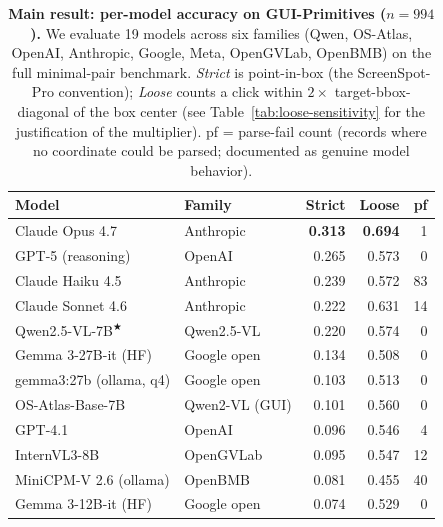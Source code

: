 \begin{table}[t]
\centering
\small
\begin{threeparttable}
\caption{\textbf{Main result: per-model accuracy on GUI-Primitives ($n{=}994$).}
We evaluate 19 models across six families (Qwen, OS-Atlas, OpenAI, Anthropic,
Google, Meta, OpenGVLab, OpenBMB) on the full minimal-pair benchmark.
\emph{Strict} is point-in-box (the ScreenSpot-Pro convention); \emph{Loose}
counts a click within $2{\times}$ target-bbox-diagonal of the box center
(see Table~\ref{tab:loose-sensitivity} for the justification of the
multiplier). pf = parse-fail count (records where no coordinate could be
parsed; documented as genuine model behavior).}
\label{tab:main-leaderboard}
\begin{tabular}{@{}llrrr@{}}
\toprule
\textbf{Model} & \textbf{Family} & \textbf{Strict} & \textbf{Loose} & \textbf{pf}\\
\midrule
Claude Opus 4.7         & Anthropic       & \textbf{0.313} & \textbf{0.694} & 1   \\
GPT-5 (reasoning)       & OpenAI          & 0.265          & 0.573          & 0   \\
Claude Haiku 4.5        & Anthropic       & 0.239          & 0.572          & 83  \\
Claude Sonnet 4.6       & Anthropic       & 0.222          & 0.631          & 14  \\
Qwen2.5-VL-7B$^{\bigstar}$           & Qwen2.5-VL      & 0.220          & 0.574          & 0   \\
Gemma 3-27B-it (HF)     & Google open     & 0.134          & 0.508          & 0   \\
gemma3:27b (ollama, q4) & Google open     & 0.103          & 0.513          & 0   \\
OS-Atlas-Base-7B        & Qwen2-VL (GUI)  & 0.101          & 0.560          & 0   \\
GPT-4.1                 & OpenAI          & 0.096          & 0.546          & 4   \\
InternVL3-8B            & OpenGVLab       & 0.095          & 0.547          & 12  \\
MiniCPM-V 2.6 (ollama)  & OpenBMB         & 0.081          & 0.455          & 40  \\
Gemma 3-12B-it (HF)     & Google open     & 0.074          & 0.529          & 0   \\

\end{tabular}
\end{threeparttable}
\end{table}
